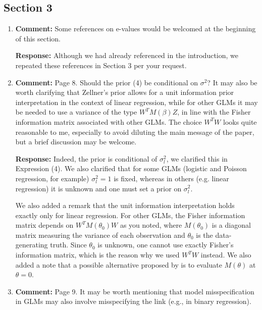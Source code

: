 \documentclass[11pt, a4paper]{article}
\newcommand{\reply}{\vspace{0.3cm} \noindent \textbf{Response:} {\it }}
\begin{document}
\subsection*{Section 3}

\begin{enumerate}[leftmargin=*]

\item \textbf{Comment:} Some references on e-values would be welcomed at the beginning of this section.

\reply Although we had already referenced \cite{vovk:2021,gruenwald:2024,chugg:2026,ramdas:2025} in the introduction, we repeated these references in Section 3 per your request.

\vspace{0.5cm}

    \item \textbf{Comment:} Page 8. Should the prior (4) be conditional on $\sigma^2$? It may also be worth clarifying that Zellner's prior allows for a unit information prior interpretation in the context of linear regression, while for other GLMs it may be needed to use a variance of the type $W^T M(\beta) Z$, in line with the Fisher information matrix associated with other GLMs. The choice $W^T W$ looks quite reasonable to me, especially to avoid diluting the main message of the paper, but a brief discussion may be welcome.

    \reply Indeed, the prior is conditional of $\sigma_l^2$, we clarified this in Expression (4). We also clarified that for some GLMs (logistic and Poisson regression, for example) $\sigma_l^2=1$ is fixed, whereas in others (e.g. linear regression) it is unknown and one must set a prior on $\sigma_l^2$.

We also added a remark that the unit information interpretation holds exactly only for linear regression. For other GLMs, the Fisher information matrix depends on $W^T M(\theta_0) W$ as you noted, where $M(\theta_0)$ is a diagonal matrix measuring the variance of each observation and $\theta_0$ is the data-generating truth. Since $\theta_0$ is unknown, one cannot use exactly Fisher's information matrix, which is the reason why we used $W^T W$ instead. We also added a note that a possible alternative proposed by \cite{sabanes:2011} is to evaluate $M(\theta)$ at $\theta = 0$.

    \vspace{0.5cm}

    \item \textbf{Comment:} Page 9. It may be worth mentioning that model misspecification in GLMs may also involve misspecifying the link (e.g., in binary regression).


\end{enumerate}
\end{document}
